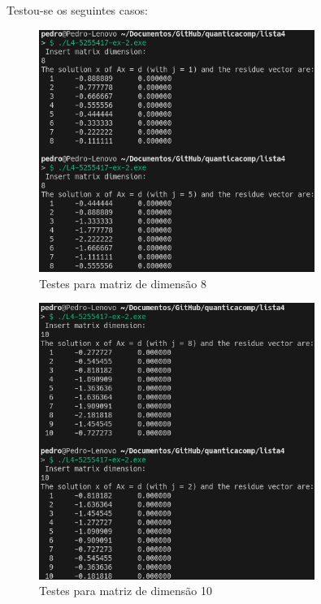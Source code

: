 \documentclass[12pt, a4paper]{article} %
\begin{document}
        Testou-se os seguintes casos:
        \begin{figure}[H]
            \centering
            \includegraphics[width=0.8\textwidth]{../images/ex2-results-8.png}
            \caption{Testes para matriz de dimensão 8}
        \end{figure}
        \begin{figure}[H]
            \centering
            \includegraphics[width=0.8\textwidth]{../images/ex2-results-10.png}
            \caption{Testes para matriz de dimensão 10}
        \end{figure}
\end{document}
